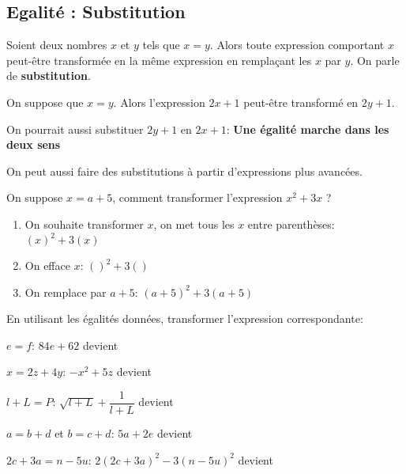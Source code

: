 \documentclass{poly}
\begin{document}
\newpage
\subsection{Egalité : Substitution}

\begin{proposition}
Soient deux nombres $x$ et $y$ tels que $x = y$. Alors toute expression comportant $x$ peut-être transformée en la même expression en remplaçant les $x$ par $y$. On parle de \textbf{substitution}.
\end{proposition}
\begin{example}
On suppose que $x = y$. Alors l'expression $2x + 1$ peut-être transformé en $2y + 1$.
\end{example}
\begin{remark}
\hfill
On pourrait aussi substituer $2y + 1$ en $2x + 1$: \textbf{Une égalité marche dans les deux sens}
\end{remark}
On peut aussi faire des substitutions à partir d'expressions plus avancées.
\begin{method}
\end{method}
On suppose $x = a + 5$, comment transformer l'expression $x^2 +3x$ ?
\begin{enumerate}
\item On souhaite transformer $x$, on met tous les $x$ entre parenthèses: $(x)^2 + 3(x)$
\item On efface $x$: $()^2 + 3()$
\item On remplace par $a + 5$: $(a + 5)^2 + 3(a + 5)$ 
\end{enumerate}

\begin{exercize}
En utilisant les égalités données, transformer l'expression correspondante:
\begin{alphaquestions}
\item $e = f$: $84e + 62$ devient \answerline
\item $x = 2z + 4y$: $-x^2 + 5z$ devient \answerline
\item $l + L = P$: $\sqrt{l + L} + \dfrac{1}{l + L}$ devient \answerline
\item $a = b + d$ et $b = c + d$: $5a + 2e$ devient \answerline
\item $2c + 3a = n - 5u$: $2(2c + 3a)^2 - 3(n - 5u)^2$ devient \answerline
\end{alphaquestions}
\end{exercize}
\end{document}
